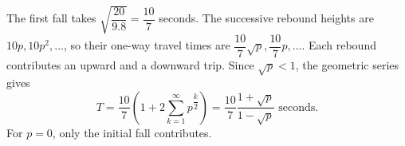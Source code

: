 The first fall takes $\sqrt{\dfrac{20}{9.8}}=\dfrac{10}{7}$ seconds. The successive rebound heights are $10p,10p^2,\ldots$, so their one-way travel times are $\dfrac{10}{7}\sqrt p,\dfrac{10}{7}p,\ldots$. Each rebound contributes an upward and a downward trip. Since $\sqrt p<1$, the geometric series gives\[T=\dfrac{10}{7}\left(1+2\sum_{k=1}^{\infty}p^{\dfrac{k}{2}}\right)=\boxed{\dfrac{10}{7}\dfrac{1+\sqrt p}{1-\sqrt p}\text{ seconds}}.\] For $p=0$, only the initial fall contributes.
